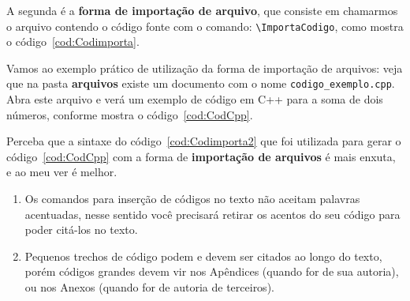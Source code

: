 A segunda é a {\bf forma de importação de arquivo}, que consiste em chamarmos o arquivo contendo o código fonte com o comando: \verb|\ImportaCodigo|, como mostra o código~\ref{cod:Codimporta}.

\begin{Codigo}[language=tex, caption=Forma de importar Códigos para o texto, label=cod:Codimporta]
\end{Codigo}

\pagebreak\clearpage\newpage

Vamos ao exemplo prático de utilização da forma de importação de arquivos: veja que na pasta {\bf arquivos} existe um documento com o nome \verb|codigo_exemplo.cpp|. Abra este arquivo e verá um exemplo de código em C++ para a soma de dois números, conforme mostra o código~\ref{cod:CodCpp}.



Perceba que a sintaxe do código~\ref{cod:Codimporta2} que foi utilizada para gerar o código~\ref{cod:CodCpp} com a forma de {\bf importação de arquivos} é mais enxuta, e ao meu ver é melhor.    

\vspace{5mm}
\begin{Codigo}[language=tex, caption=Forma de importar Códigos para o texto, label=cod:Codimporta2]
\end{Codigo}

\vspace{0.6cm}
\begin{CaixaVermelha}
     \begin{enumerate}
         \item Os comandos para inserção de códigos no texto não aceitam palavras acentuadas, nesse sentido você precisará retirar os acentos do seu código para poder citá-los no texto.
        \item Pequenos trechos de código podem e devem ser citados ao longo do texto, porém códigos grandes devem vir nos Apêndices (quando for de sua autoria), ou nos Anexos (quando for de autoria de terceiros).
     \end{enumerate}
\end{CaixaVermelha}


